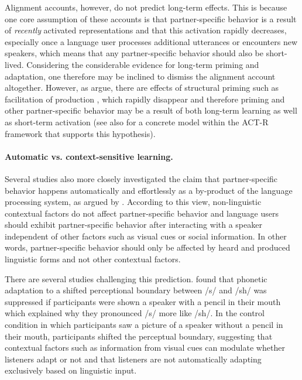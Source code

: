  Alignment accounts, however, do not predict long-term effects. This is because one core assumption
of these accounts is that partner-specific behavior is a result of \textit{recently} activated representations and that this activation rapidly decreases, especially once a language user
processes additional utterances or encounters new speakers, which means that any partner-specific behavior should also be short-lived. Considering the considerable evidence 
for long-term priming and adaptation, one therefore may be inclined to dismiss the alignment account altogether. However, as \textcite{Ferreira2006} argue, there are effects of structural priming
such as facilitation of production \cite{Wheeldon2003}, which rapidly disappear and therefore priming and other partner-specific behavior may be a result of both long-term learning as well as 
short-term activation (see also \textcite{Reitter2011} for a concrete model within the ACT-R framework that supports this hypothesis).

\paragraph{Automatic vs. context-sensitive learning.} Several studies also more closely investigated the claim that partner-specific behavior happens
automatically and effortlessly as a by-product of the language processing system, as argued by \textcite{Pickering2004}. According to this view,
non-linguistic contextual factors do not affect partner-specific behavior and language users should exhibit partner-specific behavior after interacting with a speaker independent of 
other factors such as visual cues or social information. In other words, partner-specific behavior should only be affected by heard and produced linguistic forms and not
other contextual factors. 

There are several studies challenging this prediction. \textcite{Kraljic2008} found that phonetic adaptation to a shifted perceptional boundary between /s/
and /sh/ was suppressed if participants were shown a speaker with a pencil in their mouth which explained why they pronounced /s/ more like /sh/. In the control
condition in which participants saw a picture of a speaker without a pencil in their mouth, participants shifted the perceptual boundary, suggesting that contextual
factors such as information from visual cues can modulate whether listeners adapt or not and that listeners are not automatically adapting exclusively based
on linguistic input.

